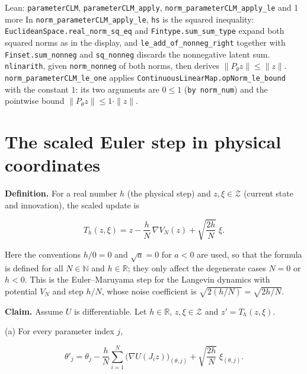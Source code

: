 \documentclass[11pt,a4paper]{article}
\begin{document}
\begin{leanbox}{Lean: \texttt{parameterCLM}, \texttt{parameterCLM\_\allowbreak{}apply}, \texttt{norm\_\allowbreak{}parameterCLM\_\allowbreak{}apply\_\allowbreak{}le} and 1 more}
In \texttt{norm\_\allowbreak{}parameter\allowbreak{}CLM\_\allowbreak{}apply\_\allowbreak{}le}, \texttt{hs} is the squared inequality: \texttt{Euclidean\allowbreak{}Space.\allowbreak{}real\_\allowbreak{}norm\_\allowbreak{}sq\_\allowbreak{}eq} and \texttt{Fintype.\allowbreak{}sum\_\allowbreak{}sum\_\allowbreak{}type} expand both squared norms as in the display, and \texttt{le\_\allowbreak{}add\_\allowbreak{}of\_\allowbreak{}nonneg\_\allowbreak{}right} together with \texttt{Finset.\allowbreak{}sum\_\allowbreak{}nonneg} and \texttt{sq\_\allowbreak{}nonneg} discards the nonnegative latent sum. \texttt{nlinarith}, given \texttt{norm\_\allowbreak{}nonneg} of both norms, then derives \(\|P_\theta z\|\le\|z\|\). \texttt{norm\_\allowbreak{}parameter\allowbreak{}CLM\_\allowbreak{}le\_\allowbreak{}one} applies \texttt{Continuous\allowbreak{}Linear\allowbreak{}Map.\allowbreak{}op\allowbreak{}Norm\_\allowbreak{}le\_\allowbreak{}bound} with the constant \(1\): its two arguments are \(0\le1\) (\texttt{by norm\_\allowbreak{}num}) and the pointwise bound \(\|P_\theta z\|\le1\cdot\|z\|\).
\end{leanbox}

\section{\texorpdfstring{The scaled Euler step in physical coordinates}{The scaled Euler step in physical coordinates}}


\textbf{Definition.} For a real number \(h\) (the physical step) and \(z,\xi\in\mathcal Z\) (current state and innovation), the scaled update is


\[T_h(z,\xi)=z-\frac hN\,\nabla V_N(z)+\sqrt{\frac{2h}N}\;\xi .\]


Here the conventions \(h/0=0\) and \(\sqrt a=0\) for \(a<0\) are used, so that the formula is defined for all \(N\in\mathbb N\) and \(h\in\mathbb R\); they only affect the degenerate cases \(N=0\) or \(h<0\). This is the Euler–Maruyama step for the Langevin dynamics with potential \(V_N\) and step \(h/N\), whose noise coefficient is \(\sqrt{2(h/N)}=\sqrt{2h/N}\).




\textbf{Claim.} Assume \(U\) is differentiable. Let \(h\in\mathbb R\), \(z,\xi\in\mathcal Z\) and \(z'=T_h(z,\xi)\).




(a) For every parameter index \(j\),


\[\theta'_j=\theta_j-\frac hN\sum_{i=1}^N\bigl(\nabla U(J_iz)\bigr)_{(\theta,j)}+\sqrt{\frac{2h}N}\;\xi_{(\theta,j)} .\]
\end{document}
